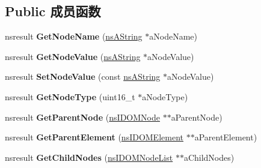 \subsection*{Public 成员函数}
\begin{DoxyCompactItemize}
\item 
\mbox{\label{interfacens_i_d_o_m_node_aaff4e9dc40217c1928f1841576c586f3}} 
nsresult {\bfseries Get\+Node\+Name} (\hyperlink{structns_string_container}{ns\+A\+String} $\ast$a\+Node\+Name)
\item 
\mbox{\label{interfacens_i_d_o_m_node_ab078d39c0a17105ead601c8d8758604e}} 
nsresult {\bfseries Get\+Node\+Value} (\hyperlink{structns_string_container}{ns\+A\+String} $\ast$a\+Node\+Value)
\item 
\mbox{\label{interfacens_i_d_o_m_node_aed0bf72804f60e14e9f49a27584198c9}} 
nsresult {\bfseries Set\+Node\+Value} (const \hyperlink{structns_string_container}{ns\+A\+String} $\ast$a\+Node\+Value)
\item 
\mbox{\label{interfacens_i_d_o_m_node_a688d1a5693135d6f91f92ec9158386fe}} 
nsresult {\bfseries Get\+Node\+Type} (uint16\+\_\+t $\ast$a\+Node\+Type)
\item 
\mbox{\label{interfacens_i_d_o_m_node_a5afb6cf0ab63bd34f741e321e38f83dc}} 
nsresult {\bfseries Get\+Parent\+Node} (\hyperlink{interfacens_i_d_o_m_node}{ns\+I\+D\+O\+M\+Node} $\ast$$\ast$a\+Parent\+Node)
\item 
\mbox{\label{interfacens_i_d_o_m_node_a020a081802fc7b7d114f6e6f0c5326dc}} 
nsresult {\bfseries Get\+Parent\+Element} (\hyperlink{interfacens_i_d_o_m_element}{ns\+I\+D\+O\+M\+Element} $\ast$$\ast$a\+Parent\+Element)
\item 
\mbox{\label{interfacens_i_d_o_m_node_a0d4efda835590317fe7f03cecb6177c6}} 
nsresult {\bfseries Get\+Child\+Nodes} (\hyperlink{interfacens_i_d_o_m_node_list}{ns\+I\+D\+O\+M\+Node\+List} $\ast$$\ast$a\+Child\+Nodes)
\item 
\mbox{\label{interfacens_i_d_o_m_node_a915020c5bf437dfd1fa09a0d4c5c3a0d}} 
$$
\end{DoxyCompactItemize}
